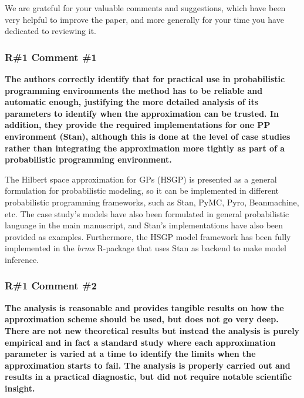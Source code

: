 \documentclass[11pt]{report}
\begin{document}
We are grateful for your valuable comments and suggestions, which have been very helpful to improve the paper, and more generally for your time you have dedicated to reviewing it.

\subsubsection*{R\#1 Comment \#1}

\textbf{The authors correctly identify that for practical use in probabilistic programming environments the method has to be reliable and automatic enough, justifying the more detailed analysis of its parameters to identify when the approximation can be trusted. In addition, they provide the required implementations for one PP environment (Stan), although this is done at the level of case studies rather than integrating the approximation more tightly as part of a probabilistic programming environment.}

The Hilbert space approximation for GPs (HSGP) is presented as a general formulation for probabilistic modeling, so it can be implemented in different probabilistic programming frameworks, such as Stan, PyMC, Pyro, Beanmachine, etc. The case study's models have also been formulated in general probabilistic language in the main manuscript, and Stan's implementations have also been provided as examples. Furthermore, the HSGP model framework has been fully implemented in the \textit{brms} R-package that uses Stan as backend to make model inference.


 

\subsubsection*{R\#1 Comment \#2}

\textbf{The analysis is reasonable and provides tangible results on how the approximation scheme should be used, but does not go very deep. There are not new theoretical results but instead the analysis is purely empirical and in fact a standard study where each approximation parameter is varied at a time to identify the limits when the approximation starts to fail. The analysis is properly carried out and results in a practical diagnostic, but did not require notable scientific insight.}
\end{document}
